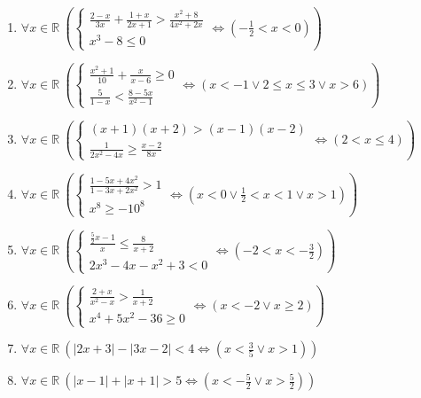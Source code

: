 \documentclass[11pt,a4paper]{article}
\begin{document}
\begin{enumerate}
\item $\displaystyle \forall x \in \mathbb{R}\ \left( \begin{cases} \frac{2 - x}{3x} + \frac{1 + x}{2x + 1} > \frac{x^{2} + 8}{4x^{2} + 2x} \\ x^{3} - 8 \le 0 \end{cases} \iff \left( -\frac{1}{2} < x < 0 \right) \right)$
\item $\displaystyle \forall x \in \mathbb{R}\ \left( \begin{cases} \frac{x^{2} + 1}{10} + \frac{x}{x - 6} \ge 0 \\ \frac{5}{1 - x} < \frac{8 - 5x}{x^{2} - 1} \end{cases} \iff \left( x < -1 \lor 2 \le x \le 3 \lor x > 6 \right) \right)$
\item $\displaystyle \forall x \in \mathbb{R}\ \left( \begin{cases} (x + 1)(x + 2) > (x - 1)(x - 2) \\ \frac{1}{2x^{2} - 4x} \ge \frac{x - 2}{8x} \end{cases} \iff \left( 2 < x \le 4 \right) \right)$
\item $\displaystyle \forall x \in \mathbb{R}\ \left( \begin{cases} \frac{1 - 5x + 4x^{2}}{1 - 3x + 2x^{2}} > 1 \\ x^{8} \ge -10^{8} \end{cases} \iff \left( x < 0 \lor \frac{1}{2} < x < 1 \lor x > 1 \right) \right)$
\item $\displaystyle \forall x \in \mathbb{R}\ \left( \begin{cases} \frac{\frac{5}{2}x - 1}{x} \le \frac{8}{x + 2} \\ 2x^{3} - 4x - x^{2} + 3 < 0 \end{cases} \iff \left( -2 < x < -\frac{3}{2} \right) \right)$
\item $\displaystyle \forall x \in \mathbb{R}\ \left( \begin{cases} \frac{2 + x}{x^{2} - x} > \frac{1}{x + 2} \\ x^{4} + 5x^{2} - 36 \ge 0 \end{cases} \iff \left( x < -2 \lor x \ge 2 \right) \right)$
\item $\displaystyle \forall x \in \mathbb{R}\ \left( \left|2x + 3\right| - \left|3x - 2\right| < 4 \iff \left( x < \frac{3}{5} \lor x > 1 \right) \right)$
\item $\displaystyle \forall x \in \mathbb{R}\ \left( \left|x - 1\right| + \left|x + 1\right| > 5 \iff \left( x < -\frac{5}{2} \lor x > \frac{5}{2} \right) \right)$

\end{enumerate}
\end{document}
